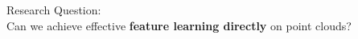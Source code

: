 %
%
%


\begin{frame}[c]
    \LARGE
    \begin{centering}
        Research Question: \\
        \vspace{1cm}
        Can we achieve effective \textbf{feature learning directly} on point clouds?
    \end{centering}
\end{frame}

